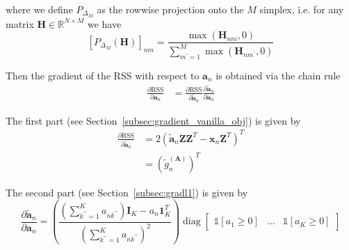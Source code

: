 \documentclass[oneside]{article}
\begin{document}
where we define $P_{\Delta_M}$ as the rowwise projection onto the $M$ simplex, i.e. for any matrix $\mathbf{H} \in \mathbb{R}^{N \times M}$ we have
\begin{equation}
    \left[ P_{\Delta_M}(\mathbf{H}) \right]_{nm} = \frac{\max(\mathbf{H}_{nm},0)}{\sum_{m^\prime=1}^M \max(\mathbf{H}_{nm^\prime}, 0)}
\end{equation}

Then the gradient of the RSS with respect to $\mathbf{a}_{n}$ is obtained via the chain rule
\begin{equation}
    \begin{aligned}
        \frac{\partial \text{RSS}}{\partial \mathbf{a}_{n}} &= \frac{\partial \text{RSS}}{\partial \tilde{\mathbf{a}}_n} \frac{\partial \tilde{\mathbf{a}}_n}{\partial \mathbf{a}_n}
    \end{aligned}
\end{equation}

The first part (see Section~\ref{subsec:gradient_vanilla_obj}) is given by
\begin{equation}
    \begin{aligned}
        \frac{\partial \text{RSS}}{\partial \tilde{\mathbf{a}}_n}
        &= 2 \left( \tilde{\mathbf{a}}_n \mathbf{Z} \mathbf{Z}^T - \mathbf{x}_n \mathbf{Z}^T \right)^T \\
        &= \left( \tilde{g}^{(\mathbf{A})}_n \right)^T
    \end{aligned}
\end{equation}

The second part (see Section~\ref{subsec:gradl1}) is given by
\begin{equation}
    \frac{\partial  \tilde{\mathbf{a}}_n}{\partial \mathbf{a}_{n}} = \left( \frac{\left( \sum_{k^{\prime \prime}=1}^K a_{nk^{\prime \prime}} \right) \mathbf{I}_K - a_n \mathbf{1}_K^T}{\left( \sum_{k^{\prime \prime}=1}^K a_{nk^{\prime \prime}} \right)^2} \right)
    \operatorname{diag} \begin{bmatrix} \mathds{1} \left[ a_1 \geq 0 \right] & ... & \mathds{1} \left[ a_K \geq 0 \right] \end{bmatrix}
\end{equation}
\end{document}
